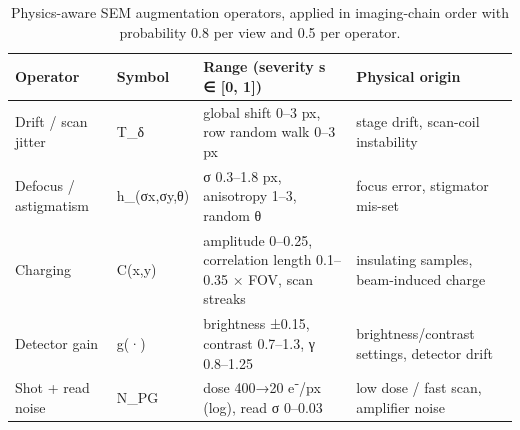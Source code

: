 \begin{table}
\caption{Physics-aware SEM augmentation operators, applied in imaging-chain order with probability 0.8 per view and 0.5 per operator.}
\label{tab:t2_physics}
\begin{tabular}{llll}
\toprule
Operator & Symbol & Range (severity s ∈ [0, 1]) & Physical origin \\
\midrule
Drift / scan jitter & T\_δ & global shift 0–3 px, row random walk 0–3 px & stage drift, scan-coil instability \\
Defocus / astigmatism & h\_(σx,σy,θ) & σ 0.3–1.8 px, anisotropy 1–3, random θ & focus error, stigmator mis-set \\
Charging & C(x,y) & amplitude 0–0.25, correlation length 0.1–0.35 × FOV, scan streaks & insulating samples, beam-induced charge \\
Detector gain & g(·) & brightness ±0.15, contrast 0.7–1.3, γ 0.8–1.25 & brightness/contrast settings, detector drift \\
Shot + read noise & N\_PG & dose 400→20 e⁻/px (log), read σ 0–0.03 & low dose / fast scan, amplifier noise \\
\bottomrule
\end{tabular}
\end{table}
